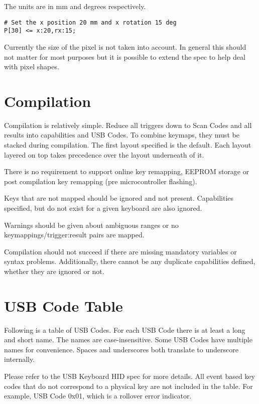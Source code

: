 \documentclass{kiibohd-template}
\begin{document}
The units are in mm and degrees respectively.

\begin{lstlisting}
# Set the x position 20 mm and x rotation 15 deg
P[30] <= x:20,rx:15;
\end{lstlisting}

Currently the size of the pixel is not taken into account.
In general this should not matter for most purposes but it is possible to extend the spec to help deal with pixel shapes.


\chapter{Compilation}

Compilation is relatively simple.
Reduce all triggers down to Scan Codes and all results into capabilities and USB Codes.
To combine keymaps, they must be stacked during compilation.
The first layout specified is the default.
Each layout layered on top takes precedence over the layout underneath of it.

There is no requirement to support online key remapping, EEPROM storage or post compilation key remapping (pre microcontroller flashing).

Keys that are not mapped should be ignored and not present.
Capabilities specified, but do not exist for a given keyboard are also ignored.

Warnings should be given about ambiguous ranges or no keymappings/trigger:result pairs are mapped.

Compilation should not succeed if there are missing mandatory variables or syntax problems.
Additionally, there cannot be any duplicate capabilities defined, whether they are ignored or not.


\newpage
\chapter{USB Code Table}
\label{chpt:USBCodeTable}

Following is a table of USB Codes.
For each USB Code there is at least a long and short name.
The names are case-insensitive.
Some USB Codes have multiple names for convenience.
Spaces and underscores both translate to underscore internally.

Please refer to the USB Keyboard HID spec for more details.
All event based key codes that do not correspond to a physical key are not included in the table.
For example, USB Code 0x01, which is a rollover error indicator.
\end{document}

